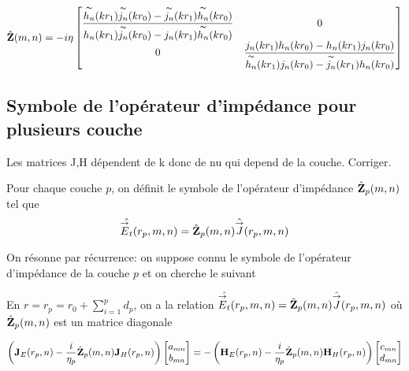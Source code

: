         \begin{equation}
            \hat{\mZ}(m,n) = -i\eta
            \begin{bmatrix}
                \frac
                {\tilde{h_n}(kr_1)\tilde{j_n}(kr_0)-\tilde{j_n}(kr_1)\tilde{h_n}(kr_0)}
                {{h_n}(kr_1)\tilde{j_n}(kr_0)-{j_n}(kr_1)\tilde{h_n}(kr_0)} & 0
                \\
                0 & \frac
                {{j_n}(kr_1){h_n}(kr_0)-{h_n}(kr_1){j_n}(kr_0)}
                {\tilde{h_n}(kr_1){j_n}(kr_0)-\tilde{j_n}(kr_1){h_n}(kr_0)}
            \end{bmatrix}
        \end{equation}

    \subsection{Symbole de l'opérateur d'impédance pour plusieurs couche}

        \begin{TODO}
            Les matrices J,H dépendent de k donc de nu qui depend de la couche. Corriger.
        \end{TODO}

        \begin{figure}[!hbt]
          \centering
          \begin{tikzpicture}
            
          \end{tikzpicture}
        \end{figure}


        \begin{defn}
          Pour chaque couche \(p\), on définit le symbole de l'opérateur d'impédance \(\hat{\mZ}_p(m,n)\) tel que
          \[
              \hat{\vE_t}(r_p,m,n) = \hat{\mZ}_p(m,n)\hat{\vJ}(r_p,m,n)
          \]
        \end{defn}

        On résonne par récurrence: on suppose connu le symbole de l'opérateur d'impédance de la couche \(p\) et on cherche le suivant

        En \(r=r_{p}=r_0+\sum_{i=1}^p d_p\), on a la relation \( \hat{\vE_t}(r_p,m,n) = \hat{\mZ}_p(m,n)\hat{\vJ}(r_p,m,n)\) où \(\hat{\mZ}_p(m,n)\) est un matrice diagonale

        \begin{equation}
            \left(\mJ_{E}(r_p,n) - \frac{i}{\eta_p}\hat{\mZ}_p(m,n)\mJ_{H}(r_p,n) \right)
            \begin{bmatrix}
                a_{mn}
                \\
                b_{mn}
            \end{bmatrix}
            = -
            \left(\mH_{E}(r_p,n) - \frac{i}{\eta_p}\hat{\mZ}_p(m,n)\mH_{H}(r_p,n) \right)
            \begin{bmatrix}
                c_{mn}
                \\
                d_{mn}
            \end{bmatrix}
        \end{equation}

